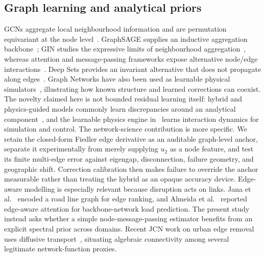 \documentclass[11pt]{article}
\begin{document}
\subsection{Graph learning and analytical priors}
GCNs aggregate local neighbourhood information and are permutation equivariant
at the node level~\cite{kipf2017}. GraphSAGE supplies an inductive aggregation
backbone~\cite{hamilton2017}; GIN studies the expressive limits of neighbourhood
aggregation~\cite{xu2019}, whereas attention and message-passing frameworks expose
alternative node/edge interactions~\cite{velickovic2018,gilmer2017}. Deep Sets provides an invariant alternative that
does not propagate along edges~\cite{zaheer2017}. Graph Networks have also been
used as learnable physical simulators~\cite{sanchezgonzalez2018}, illustrating
how known structure and learned corrections can coexist. The novelty claimed
here is not bounded residual learning itself: hybrid and physics-guided
models commonly learn discrepancies around an analytical component~\cite{yuwang2024}, and the
learnable physics engine in~\cite{sanchezgonzalez2018} learns interaction
dynamics for simulation and control. The network-science contribution is more
specific. We retain the closed-form Fiedler edge derivative as an auditable
graph-level anchor, separate it experimentally from merely supplying
$u_2$ as a node feature, and test its finite multi-edge error against eigengap,
disconnection, failure geometry, and geographic shift. Correction calibration
then makes failure to override the anchor measurable rather than treating the
hybrid as an opaque accuracy device. Edge-aware modelling is especially
relevant because disruption acts on links. Jana et al.~\cite{jana2023} encoded a
road line graph for edge ranking, and Almeida et al.~\cite{almeida2025} reported
edge-aware attention for backbone-network load prediction. The present study
instead asks whether a simple node-message-passing estimator benefits from an
explicit spectral prior across domains. Recent JCN work on urban edge removal
uses diffusive transport~\cite{bowater2026}, situating algebraic connectivity
among several legitimate network-function proxies.
\end{document}
